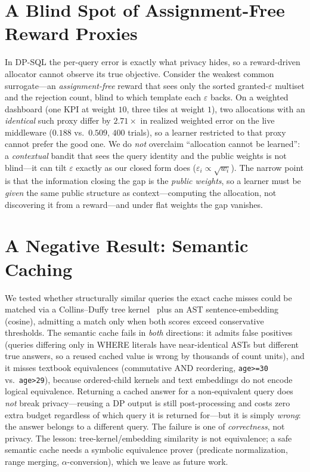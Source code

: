 \documentclass[sigconf,nonacm]{acmart}
\newcommand{\eps}{\varepsilon}
\begin{document}
\section{A Blind Spot of Assignment-Free Reward Proxies}
\label{app:identifiability}

In DP-SQL the per-query error is exactly what privacy hides, so a reward-driven allocator cannot observe its true objective. Consider the weakest common surrogate---an \emph{assignment-free} reward that sees only the sorted granted-$\eps$ multiset and the rejection count, blind to which template each $\eps$ backs. On a weighted dashboard (one KPI at weight $10$, three tiles at weight $1$), two allocations with an \emph{identical} such proxy differ by $2.71\times$ in realized weighted error on the live middleware ($0.188$ vs.\ $0.509$, $400$ trials), so a learner restricted to that proxy cannot prefer the good one. We do \emph{not} overclaim ``allocation cannot be learned'': a \emph{contextual} bandit that sees the query identity and the public weights is not blind---it can tilt $\eps$ exactly as our closed form does ($\eps_i\propto\sqrt{w_i}$). The narrow point is that the information closing the gap is the \emph{public weights}, so a learner must be \emph{given} the same public structure as context---computing the allocation, not discovering it from a reward---and under flat weights the gap vanishes.

\section{A Negative Result: Semantic Caching}
\label{app:semantic}

We tested whether structurally similar queries the exact cache misses could be matched via a Collins--Duffy tree kernel~\cite{collins2001convolution} plus an AST sentence-embedding (cosine), admitting a match only when both scores exceed conservative thresholds. The semantic cache fails in \emph{both} directions: it admits false positives (queries differing only in WHERE literals have near-identical ASTs but different true answers, so a reused cached value is wrong by thousands of count units), and it misses textbook equivalences (commutative AND reordering, \texttt{age>=30} vs.\ \texttt{age>29}), because ordered-child kernels and text embeddings do not encode logical equivalence. Returning a cached answer for a non-equivalent query does \emph{not} break privacy---reusing a DP output is still post-processing and costs zero extra budget regardless of which query it is returned for---but it is simply \emph{wrong}: the answer belongs to a different query. The failure is one of \emph{correctness}, not privacy. The lesson: tree-kernel/embedding similarity is not equivalence; a safe semantic cache needs a symbolic equivalence prover (predicate normalization, range merging, $\alpha$-conversion), which we leave as future work.
\end{document}
